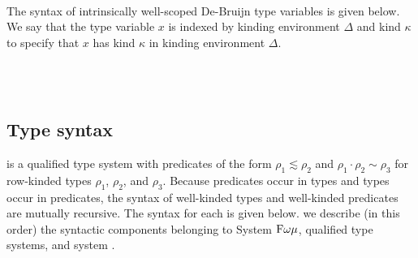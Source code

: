 \documentclass[authoryear, acmsmall, screen, review, nonacm]{acmart}
\begin{document}
\begin{code}%
\>[0]\<%
\\
\>[0][@{}l@{\AgdaIndent{0}}]%
\>[2]\<%
\\
\>[2][@{}l@{\AgdaIndent{0}}]%
\>[4]\AgdaSpace{}%
\AgdaSpace{}%
\AgdaSpace{}%
\AgdaSpace{}%
\AgdaSymbol{:}\AgdaSpace{}%
\<%
\\
%
\>[4]\AgdaSpace{}%
\AgdaSpace{}%
\AgdaSpace{}%
\AgdaSymbol{:}\AgdaSpace{}%
\<%
\end{code}

The syntax of intrinsically well-scoped De-Bruijn type variables is given below. We say that the type variable $x$ is indexed by kinding environment $\Delta$ and kind $\kappa$ to specify that $x$ has kind $\kappa$ in kinding environment $\Delta$.

\begin{code}%
\>[0]\AgdaSpace{}%
\AgdaSpace{}%
\AgdaSymbol{:}\AgdaSpace{}%
\AgdaSpace{}%
\AgdaSpace{}%
\AgdaSpace{}%
\AgdaSpace{}%
\AgdaSpace{}%
\<%
\\
\>[0][@{}l@{\AgdaIndent{0}}]%
\>[2]\AgdaSpace{}%
\AgdaSymbol{:}\AgdaSpace{}%
\AgdaSpace{}%
\AgdaSymbol{(}\AgdaSpace{}%
\AgdaOperator{\AgdaInductiveConstructor{,,}}\AgdaSpace{}%
\AgdaSymbol{)}\AgdaSpace{}%
\<%
\\
%
\>[2]\AgdaSpace{}%
\AgdaSymbol{:}\AgdaSpace{}%
\AgdaSpace{}%
\AgdaSpace{}%
\AgdaSpace{}%
\AgdaSpace{}%
\AgdaSpace{}%
\AgdaSymbol{(}\AgdaSpace{}%
\AgdaOperator{\AgdaInductiveConstructor{,,}}\AgdaSpace{}%
\AgdaSymbol{)}\AgdaSpace{}%
\<%
\end{code}

\subsection{Type syntax}

\Rome is a qualified type system with predicates of the form $\rho_1 \lesssim \rho_2$ and $\rho_1 \cdot \rho_2 \sim \rho_3$ for row-kinded types $\rho_1$, $\rho_2$, and $\rho_3$. Because predicates occur in types and types occur in predicates, the syntax of well-kinded types and well-kinded predicates are mutually recursive. The syntax for each is given below. we describe (in this order) the syntactic components belonging to System $\Fome$, qualified type systems, and system \RO.
\end{document}
